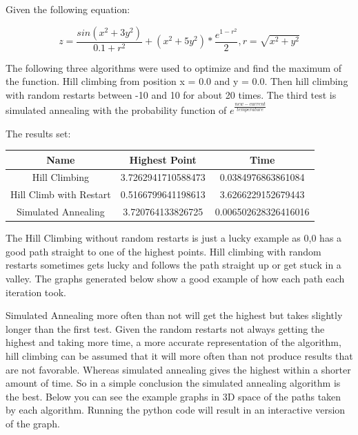 \documentclass[a4paper,12pt]{article}
\begin{document}
\pagestyle{headings}

Given the following equation:

\begin{equation}
z = \frac{sin(x^2 + 3y^2)}{0.1+r^2}
+ (x^2 + 5y^2) * \frac{e^{1-r^2}}{2},
r = \sqrt{x^2+y^2}
\end{equation}

The following three algorithms were used to optimize and find the maximum of the function. Hill climbing from position x = 0.0 and y = 0.0. Then hill climbing with random restarts between -10 and 10 for about 20 times. The third test is simulated annealing with the probability function of $ e^{\frac{new-current}{temperature}} $

The results set:

\begin{center}
 \begin{tabular}{c c c}
 \hline
 Name & Highest Point & Time  \\ [0.5ex]
 \hline\hline
 Hill Climbing & 3.7262941710588473 & 0.0384976863861084  \\
 \hline
 Hill Climb with Restart & 0.5166799641198613 & 3.6266229152679443 \\
 \hline
 Simulated Annealing & 3.720764133826725 & 0.006502628326416016 \\
 \hline
\end{tabular}
\end{center}

The Hill Climbing without random restarts is just a lucky example as 0,0 has a good path straight to one of the highest points. Hill climbing with random restarts sometimes gets lucky and follows the path straight up or get stuck in a valley. The graphs generated below show a good example of how each path each iteration took.

Simulated Annealing more often than not will get the highest but takes slightly longer than the first test. Given the random restarts not always getting the highest and taking more time, a more accurate representation of the algorithm, hill climbing can be assumed that it will more often than not produce results that are not favorable. Whereas simulated annealing gives the highest within a shorter amount of time. So in a simple conclusion the simulated annealing algorithm is the best. Below you can see the example graphs in 3D space of the paths taken by each algorithm. Running the python code will result in an interactive version of the graph.
\end{document}
